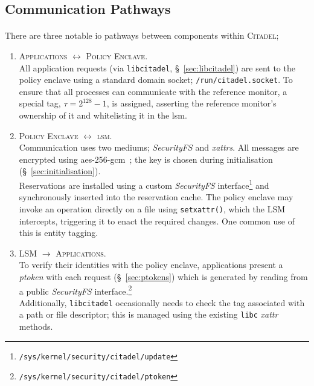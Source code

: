 \subsection{Communication Pathways}
\label{sec:interdomain-comms}
\paragraph{} There are three notable \acrshort{io} pathways between components within \textsc{Citadel};
\begin{enumerate}
    \item \textsc{Applications $\longleftrightarrow$ Policy Enclave}. \\
    All application requests (via \texttt{libcitadel}, §~\ref{sec:libcitadel}) are sent to the policy enclave using a standard domain socket; \texttt{/run/citadel.socket}. To ensure that all processes can communicate with the reference monitor, a special tag, $\tau = 2^{128} -1$, is assigned, asserting the reference monitor's ownership of it and whitelisting it in the \acrshort{lsm}.
    \item \textsc{Policy Enclave $\longleftrightarrow$ \acrshort{lsm}}. \\
    Communication uses two mediums; \textit{SecurityFS} and \textit{\acrshort{xattr}s}. All messages are encrypted using \acrshort{aes}-256-\acrshort{gcm}~\cite{Rijndael,McGrew2005TheGM}; the key is chosen during initialisation (§~\ref{sec:initialisation}). \\
    Reservations are installed using a custom \textit{SecurityFS} interface\footnote{\texttt{/sys/kernel/security/citadel/update}} and synchronously inserted into the reservation cache. The policy enclave may invoke an operation directly on a file using \texttt{setxattr()}, which the LSM intercepts, triggering it to enact the required changes. One common use of this is entity tagging.
    \item \textsc{LSM $\longrightarrow$ Applications}. \\
    To verify their identities with the policy enclave, applications present a \textit{ptoken} with each request (§~\ref{sec:ptokens}) which is generated by reading from a public \textit{SecurityFS} interface.\footnote{\texttt{/sys/kernel/security/citadel/ptoken}} \\
    Additionally, \texttt{libcitadel} occasionally needs to check the tag associated with a path or file descriptor; this is managed using the existing \texttt{libc} \textit{\acrshort{xattr}} methods.
\end{enumerate}

